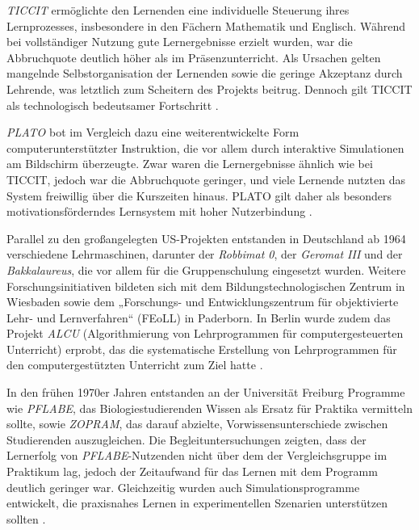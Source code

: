 \textit{TICCIT} ermöglichte den Lernenden eine individuelle Steuerung ihres Lernprozesses, insbesondere in den Fächern Mathematik und Englisch. Während bei vollständiger Nutzung gute Lernergebnisse erzielt wurden, war die Abbruchquote deutlich höher als im Präsenzunterricht. Als Ursachen gelten mangelnde Selbstorganisation der Lernenden sowie die geringe Akzeptanz durch Lehrende, was letztlich zum Scheitern des Projekts beitrug. Dennoch gilt TICCIT als technologisch bedeutsamer Fortschritt \parencites[S.~71]{oshea_lernen_1986}[S.~13]{schonfeld_computerbasiertes_2006}.

\textit{PLATO} bot im Vergleich dazu eine weiterentwickelte Form computerunterstützter Instruktion, die vor allem durch interaktive Simulationen am Bildschirm überzeugte. Zwar waren die Lernergebnisse ähnlich wie bei TICCIT, jedoch war die Abbruchquote geringer, und viele Lernende nutzten das System freiwillig über die Kurszeiten hinaus. PLATO gilt daher als besonders motivationsförderndes Lernsystem mit hoher Nutzerbindung \parencites[S.~75f]{oshea_lernen_1986}[S.~14]{schonfeld_computerbasiertes_2006}.

Parallel zu den großangelegten US-Projekten entstanden in Deutschland ab 1964 verschiedene Lehrmaschinen, darunter der \textit{Robbimat 0}, der \textit{Geromat III} und der \textit{Bakkalaureus}, die vor allem für die Gruppenschulung eingesetzt wurden. Weitere Forschungsinitiativen bildeten sich mit dem Bildungstechnologischen Zentrum in Wiesbaden sowie dem „Forschungs- und Entwicklungszentrum für objektivierte Lehr- und Lernverfahren“ (FEoLL) in Paderborn. In Berlin wurde zudem das Projekt \textit{ALCU} (Algorithmierung von Lehrprogrammen für computergesteuerten Unterricht) erprobt, das die systematische Erstellung von Lehrprogrammen für den computergestützten Unterricht zum Ziel hatte \parencites[S.~10]{niegemann_kompendium_2008}[S.~11]{schonfeld_computerbasiertes_2006}.

In den frühen 1970er Jahren entstanden an der Universität Freiburg Programme wie \textit{PFLABE}, das Biologiestudierenden Wissen als Ersatz für Praktika vermitteln sollte, sowie \textit{ZOPRAM}, das darauf abzielte, Vorwissensunterschiede zwischen Studierenden auszugleichen. Die Begleituntersuchungen zeigten, dass der Lernerfolg von \textit{PFLABE}-Nutzenden nicht über dem der Vergleichsgruppe im Praktikum lag, jedoch der Zeitaufwand für das Lernen mit dem Programm deutlich geringer war. Gleichzeitig wurden auch Simulationsprogramme entwickelt, die praxisnahes Lernen in experimentellen Szenarien unterstützen sollten \parencite[S.~11]{niegemann_kompendium_2008}.

